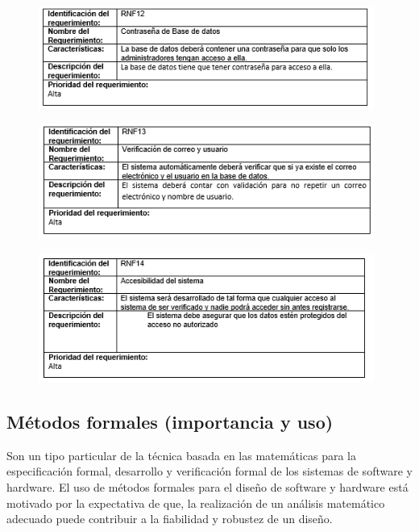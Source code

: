 \begin{figure}[htb]
\begin{center}
\includegraphics[width=11cm]{./imagenes/tablas/RNF12.png}
\end{center}

\end{figure}


\newpage


\begin{figure}[htb]
\begin{center}
\includegraphics[width=11cm]{./imagenes/tablas/RNF13.png}
\end{center}

\end{figure}





\begin{figure}[htb]
\begin{center}
\includegraphics[width=11cm]{./imagenes/tablas/RNF14.png}
\end{center}

\end{figure}


\subsection{Métodos formales (importancia y uso)}
Son un tipo particular de la técnica basada en las matemáticas para la especificación formal, desarrollo y verificación formal de los sistemas de software y hardware. El uso de métodos formales para el diseño de software y hardware está motivado por la expectativa de que, la realización de un análisis matemático adecuado puede contribuir a la fiabilidad y robustez de un diseño. 

